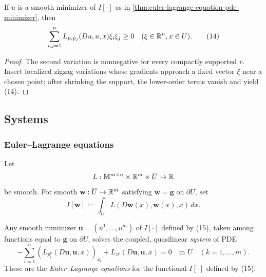 \begin{proposition}
\label{prop:second-variation-convexity-necessary-condition}

If $u$ is a smooth minimizer of $I[\cdot]$ as in \cref{thm:euler-lagrange-equation-pde-minimizer}, then
\[
\sum_{i,j=1}^n L_{p_i p_j}(Du, u, x)\xi_i \xi_j \geq 0 \quad (\xi \in \mathbb{R}^n, x \in U).
\tag{14}
\]
\end{proposition}

\begin{proof}
\sketch The second variation is nonnegative for every compactly supported $v$. Insert localized zigzag variations whose gradients approach a fixed vector $\xi$ near a chosen point; after shrinking the support, the lower-order terms vanish and yield (14).
\end{proof}

\subsection{Systems}
\label{sec:systems-calculus-of-variations}

\subsubsection{Euler--Lagrange equations}

Let
\[
L:\mathbb{M}^{m\times n}\times\mathbb{R}^m\times\overline U\to\mathbb{R}
\]
be smooth. For smooth $\mathbf w:\overline U\to\mathbb{R}^m$ satisfying
$\mathbf w=\mathbf g$ on $\partial U$, set
\[
I[\mathbf w]:=\int_U L(D\mathbf w(x),\mathbf w(x),x)\,dx.
\tag{15}
\]

\begin{theorem}
\label{thm:euler-lagrange-system-pde-minimizer}

Any smooth minimizer $\mathbf{u} = (u^1,\ldots,u^m)$ of $I[\cdot]$ defined by (15), taken among functions equal to $\mathbf{g}$ on $\partial U$, solves the coupled, quasilinear \textit{system} of PDE
\[
-\sum_{i=1}^n \left( L_{p_i^k}(D\mathbf{u}, \mathbf{u}, x) \right)_{x_i} + L_{z^k}(D\mathbf{u}, \mathbf{u}, x) = 0 \quad \text{in } U \quad (k = 1, \ldots, m).
\]
These are the \textit{Euler--Lagrange equations} for the functional $I[\cdot]$ defined by (15).
\end{theorem}

